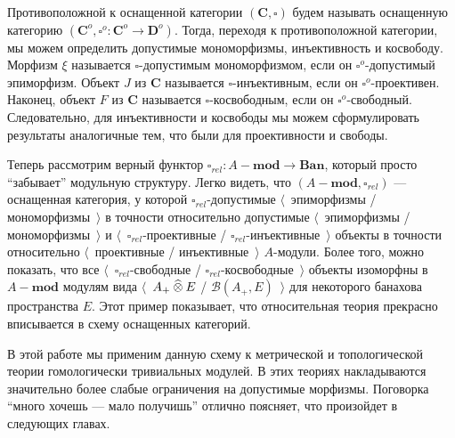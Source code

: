 Противоположной к оснащенной категории $(\mathbf{C}, \square)$ будем называть
оснащенную категорию
$(\mathbf{C}^{o},\square^{o}:\mathbf{C}^{o}\to\mathbf{D}^{o})$. Тогда, переходя
к противоположной категории, мы можем определить допустимые мономорфизмы,
инъективность и косвободу. Морфизм $\xi$ называется $\square$-допустимым
мономорфизмом, если он $\square^o$-допустимый эпиморфизм. Объект $J$ из
$\mathbf{C}$ называется $\square$-инъективным, если он $\square^o$-проективен.
Наконец, объект $F$ из $\mathbf{C}$ называется $\square$-косвободным, если он
$\square^o$-свободный. Следовательно, для инъективности и косвободы мы можем
сформулировать результаты аналогичные тем, что были для проективности и свободы.

Теперь рассмотрим верный функтор $\square_{rel}:A-\mathbf{mod}\to\mathbf{Ban}$,
который просто ``забывает'' модульную структуру. Легко видеть, что
$(A-\mathbf{mod},\square_{rel})$ --- оснащенная категория, у которой
$\square_{rel}$-допустимые $\langle$~эпиморфизмы / мономорфизмы~$\rangle$ в
точности относительно допустимые $\langle$~эпиморфизмы / мономорфизмы~$\rangle$
и $\langle$~$\square_{rel}$-проективные / $\square_{rel}$-инъективные~$\rangle$
объекты в точности относительно $\langle$~проективные / инъективные~$\rangle$
$A$-модули. Более того, можно показать, что все
$\langle$~$\square_{rel}$-свободные / $\square_{rel}$-косвободные~$\rangle$
объекты изоморфны в $A-\mathbf{mod}$ модулям вида $\langle$~$A_+\mathbin{\widehat{\otimes}} E$ /
$\mathcal{B}(A_+,E)$~$\rangle$ для некоторого банахова пространства $E$. Этот
пример показывает, что относительная теория прекрасно вписывается в схему
оснащенных категорий.

В этой работе мы применим данную схему к метрической и топологической теории
гомологически тривиальных модулей. В этих теориях накладываются значительно
более слабые ограничения на допустимые морфизмы. Поговорка ``много хочешь ---
мало получишь'' отлично поясняет, что произойдет в следующих главах.
